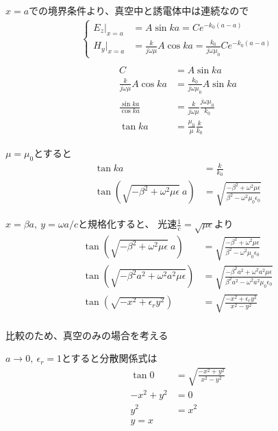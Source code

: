 \documentclass[a4paper,10pt]{bxjsarticle}
\begin{document}
$x=a$での境界条件より、真空中と誘電体中は連続なので
\begin{align*}
    \begin{cases}
        E_z |_{x=a} &= A \sin ka = C e^{-k_0(a-a)} \\
        H_y |_{x=a} &= \frac{k}{j\omega \mu} A \cos ka = \frac{k_0}{j\omega \mu_0} C e^{-k_0(a-a)}
    \end{cases} \\
\end{align*}
\begin{align*}
    C &= A \sin ka \\
    \frac{k}{j\omega \mu} A \cos ka &= \frac{k_0}{j\omega \mu_0} A \sin ka \\
    \frac{\sin ka}{\cos ka} &= \frac{k}{j\omega \mu} \frac{j\omega \mu_0}{k_0}\\
    \tan ka &= \frac{\mu_0}{\mu} \frac{k}{k_0}
\end{align*}

$\mu = \mu_0$とすると
\begin{align*}
    \tan ka &= \frac{k}{k_0}\\
    \tan (\sqrt{-\beta^2+\omega^2 \mu \epsilon}\ a) &= \sqrt{\frac{-\beta^2+\omega^2 \mu \epsilon}{\beta^2-\omega^2 \mu_0 \epsilon_0}}
\end{align*}

$x = \beta a,\ y = \omega a /c$と規格化すると、
光速$\frac{1}{c} = \sqrt{\mu \epsilon} $より
\begin{align*}
    \tan (\sqrt{-\beta^2+\omega^2 \mu \epsilon}\ a) &= \sqrt{\frac{-\beta^2+\omega^2 \mu \epsilon}{\beta^2-\omega^2 \mu_0 \epsilon_0}} \\
    \tan (\sqrt{-\beta^2 a^2+\omega^2 a^2 \mu \epsilon} ) &= \sqrt{\frac{-\beta^2 a^2 +\omega^2 a^2 \mu \epsilon}{\beta^2 a^2 - \omega^2 a^2 \mu_0 \epsilon_0}} \\
    \tan (\sqrt{-x^2 + \epsilon_r y^2 } ) &= \sqrt{\frac{-x^2 + \epsilon_r y^2}{ x^2 - y^2}} \\
\end{align*} 

比較のため、真空のみの場合を考える

$a \rightarrow 0,\ \epsilon_r = 1$とすると分散関係式は
\begin{align*}
    \tan 0 &= \sqrt{\frac{-x^2 + y^2}{ x^2 - y^2}} \\
    -x^2 + y^2 &= 0 \\
    y^2 &= x^2 \\ 
    y = x
\end{align*}
\end{document}
